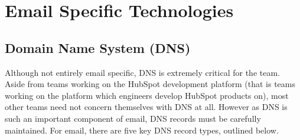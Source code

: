 \section{Email Specific Technologies}
\subsection{Domain Name System (DNS)} \label{sec:DNS}

Although not entirely email specific, DNS is extremely critical for the \team{} team. Aside from teams working on the HubSpot development platform (that is teams working on the platform which engineers develop HubSpot products on), most other teams need not concern themselves with DNS at all. However as DNS is such an important component of email, DNS records must be carefully maintained. For email, there are five key DNS record types, outlined below.


